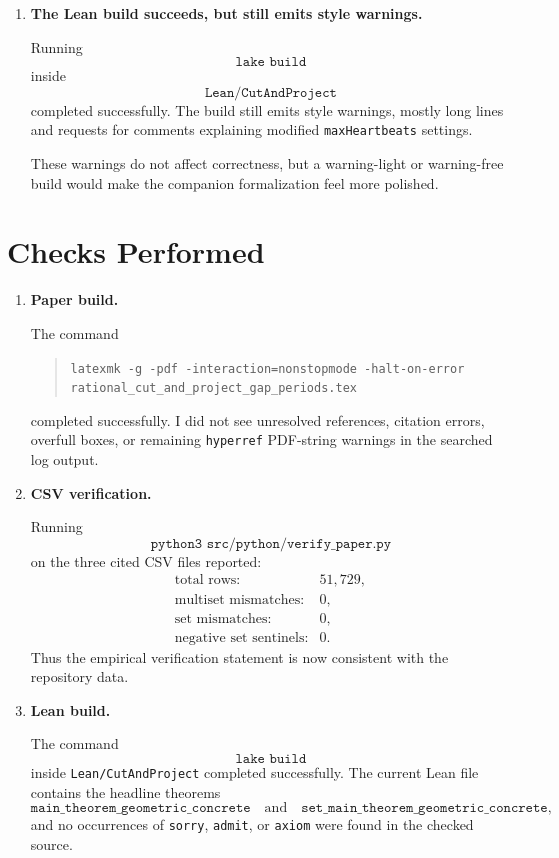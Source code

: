 \documentclass[11pt]{article}
\begin{document}
\begin{enumerate}[label=\textbf{F\arabic*.},leftmargin=*]
This is not a flaw in the main rational proof, but it would make the
complementary irrational proposition more robust.

\item \textbf{The Lean build succeeds, but still emits style warnings.}

Running
\[
\texttt{lake build}
\]
inside
\[
\texttt{Lean/CutAndProject}
\]
completed successfully.  The build still emits style warnings, mostly long
lines and requests for comments explaining modified \texttt{maxHeartbeats}
settings.

These warnings do not affect correctness, but a warning-light or
warning-free build would make the companion formalization feel more polished.

\end{enumerate}

\section*{Checks Performed}

\begin{enumerate}[leftmargin=*]

\item \textbf{Paper build.}

The command
\begin{quote}
\texttt{latexmk -g -pdf -interaction=nonstopmode -halt-on-error}\\
\texttt{rational\_cut\_and\_project\_gap\_periods.tex}
\end{quote}
completed successfully.  I did not see unresolved references, citation
errors, overfull boxes, or remaining \texttt{hyperref} PDF-string warnings in
the searched log output.

\item \textbf{CSV verification.}

Running
\[
\texttt{python3 src/python/verify\_paper.py}
\]
on the three cited CSV files reported:
\[
\begin{array}{rl}
\text{total rows:} & 51{,}729,\\
\text{multiset mismatches:} & 0,\\
\text{set mismatches:} & 0,\\
\text{negative set sentinels:} & 0.
\end{array}
\]
Thus the empirical verification statement is now consistent with the
repository data.

\item \textbf{Lean build.}

The command
\[
\texttt{lake build}
\]
inside \texttt{Lean/CutAndProject} completed successfully.  The current Lean
file contains the headline theorems
\[
\texttt{main\_theorem\_geometric\_concrete}
\quad\text{and}\quad
\texttt{set\_main\_theorem\_geometric\_concrete},
\]
and no occurrences of \texttt{sorry}, \texttt{admit}, or \texttt{axiom} were
found in the checked source.

\end{enumerate}
\end{document}
